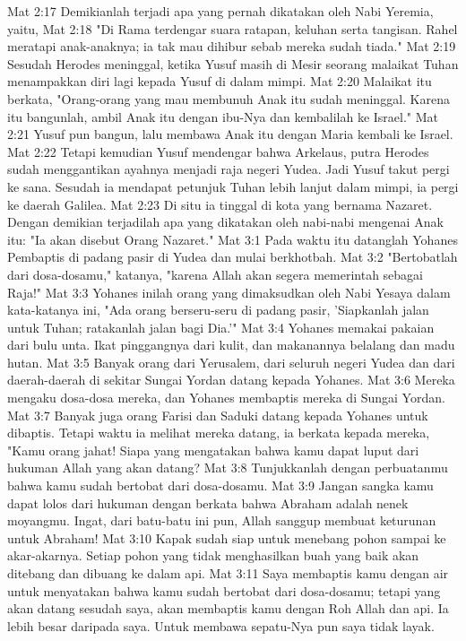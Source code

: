 Mat 2:17  Demikianlah terjadi apa yang pernah dikatakan oleh Nabi Yeremia, yaitu,
Mat 2:18  "Di Rama terdengar suara ratapan, keluhan serta tangisan. Rahel meratapi anak-anaknya; ia tak mau dihibur sebab mereka sudah tiada."
Mat 2:19  Sesudah Herodes meninggal, ketika Yusuf masih di Mesir seorang malaikat Tuhan menampakkan diri lagi kepada Yusuf di dalam mimpi.
Mat 2:20  Malaikat itu berkata, "Orang-orang yang mau membunuh Anak itu sudah meninggal. Karena itu bangunlah, ambil Anak itu dengan ibu-Nya dan kembalilah ke Israel."
Mat 2:21  Yusuf pun bangun, lalu membawa Anak itu dengan Maria kembali ke Israel.
Mat 2:22  Tetapi kemudian Yusuf mendengar bahwa Arkelaus, putra Herodes sudah menggantikan ayahnya menjadi raja negeri Yudea. Jadi Yusuf takut pergi ke sana. Sesudah ia mendapat petunjuk Tuhan lebih lanjut dalam mimpi, ia pergi ke daerah Galilea.
Mat 2:23  Di situ ia tinggal di kota yang bernama Nazaret. Dengan demikian terjadilah apa yang dikatakan oleh nabi-nabi mengenai Anak itu: "Ia akan disebut Orang Nazaret."
Mat 3:1  Pada waktu itu datanglah Yohanes Pembaptis di padang pasir di Yudea dan mulai berkhotbah.
Mat 3:2  "Bertobatlah dari dosa-dosamu," katanya, "karena Allah akan segera memerintah sebagai Raja!"
Mat 3:3  Yohanes inilah orang yang dimaksudkan oleh Nabi Yesaya dalam kata-katanya ini, "Ada orang berseru-seru di padang pasir, 'Siapkanlah jalan untuk Tuhan; ratakanlah jalan bagi Dia.'"
Mat 3:4  Yohanes memakai pakaian dari bulu unta. Ikat pinggangnya dari kulit, dan makanannya belalang dan madu hutan.
Mat 3:5  Banyak orang dari Yerusalem, dari seluruh negeri Yudea dan dari daerah-daerah di sekitar Sungai Yordan datang kepada Yohanes.
Mat 3:6  Mereka mengaku dosa-dosa mereka, dan Yohanes membaptis mereka di Sungai Yordan.
Mat 3:7  Banyak juga orang Farisi dan Saduki datang kepada Yohanes untuk dibaptis. Tetapi waktu ia melihat mereka datang, ia berkata kepada mereka, "Kamu orang jahat! Siapa yang mengatakan bahwa kamu dapat luput dari hukuman Allah yang akan datang?
Mat 3:8  Tunjukkanlah dengan perbuatanmu bahwa kamu sudah bertobat dari dosa-dosamu.
Mat 3:9  Jangan sangka kamu dapat lolos dari hukuman dengan berkata bahwa Abraham adalah nenek moyangmu. Ingat, dari batu-batu ini pun, Allah sanggup membuat keturunan untuk Abraham!
Mat 3:10  Kapak sudah siap untuk menebang pohon sampai ke akar-akarnya. Setiap pohon yang tidak menghasilkan buah yang baik akan ditebang dan dibuang ke dalam api.
Mat 3:11  Saya membaptis kamu dengan air untuk menyatakan bahwa kamu sudah bertobat dari dosa-dosamu; tetapi yang akan datang sesudah saya, akan membaptis kamu dengan Roh Allah dan api. Ia lebih besar daripada saya. Untuk membawa sepatu-Nya pun saya tidak layak.
